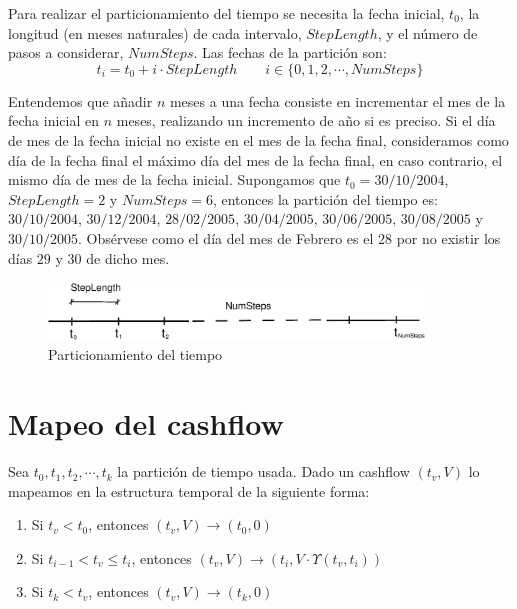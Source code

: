 Para realizar el particionamiento del tiempo se necesita la fecha inicial, $t_0$,
la longitud (en meses naturales) de cada intervalo, $StepLength$, y el n\'umero
de pasos a considerar, $NumSteps$. Las fechas de la partici\'on son:
\begin{displaymath}
t_i = t_0 + i \cdot StepLength \qquad i \in \{0, 1, 2, \cdots, NumSteps\}
\end{displaymath}

Entendemos que a\~nadir $n$ meses a una fecha consiste en incrementar el
mes de la fecha inicial en $n$ meses, realizando un incremento de a\~no si
es preciso. Si el d\'ia de mes de la fecha inicial no existe en el mes de
la fecha final, consideramos como d\'ia de la fecha final el m\'aximo d\'ia
del mes de la fecha final, en caso contrario, el mismo d\'ia de mes de la
fecha inicial.
\newline
\newline
Supongamos que $t_0=30/10/2004$, $StepLength=2$ y $NumSteps=6$, entonces la
partici\'on del tiempo es: $30/10/2004$, $30/12/2004$, $28/02/2005$, $30/04/2005$,
$30/06/2005$, $30/08/2005$ y $30/10/2005$. Obs\'ervese como el d\'ia del mes de
Febrero es el $28$ por no existir los d\'ias $29$ y $30$ de dicho mes.

\begin{figure}[!hb]
\begin{center}
\includegraphics[width=10cm,angle=0]{./images/time.eps}
\caption{Particionamiento del tiempo}
\label{timetranches}
\end{center}
\end{figure}


\section{Mapeo del cashflow}

Sea $t_0, t_1, t_2, \cdots, t_k$ la partici\'on de tiempo usada.
Dado un cashflow $(t_v,V)$ lo mapeamos en la estructura
temporal de la siguiente forma:

\begin{enumerate}
\item Si $t_v < t_0$, entonces $(t_v,V) \longrightarrow (t_0,0)$
\item Si $t_{i-1} < t_v \leq t_i$, entonces $(t_v,V) \longrightarrow (t_i,V \cdot \Upsilon(t_v,t_i))$
\item Si $t_k < t_v$, entonces $(t_v,V) \longrightarrow (t_k,0)$
\end{enumerate}

